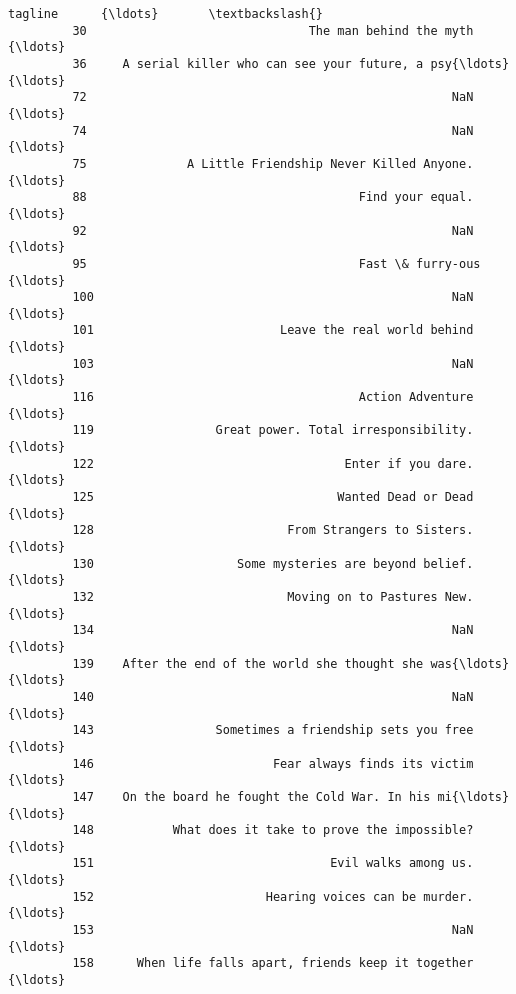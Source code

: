 \documentclass[11pt]{article}
\begin{document}
\begin{Verbatim}[commandchars=\\\{\}]
                                                          tagline      {\ldots}       \textbackslash{}
         30                               The man behind the myth      {\ldots}        
         36     A serial killer who can see your future, a psy{\ldots}      {\ldots}        
         72                                                   NaN      {\ldots}        
         74                                                   NaN      {\ldots}        
         75              A Little Friendship Never Killed Anyone.      {\ldots}        
         88                                      Find your equal.      {\ldots}        
         92                                                   NaN      {\ldots}        
         95                                      Fast \& furry-ous      {\ldots}        
         100                                                  NaN      {\ldots}        
         101                          Leave the real world behind      {\ldots}        
         103                                                  NaN      {\ldots}        
         116                                     Action Adventure      {\ldots}        
         119                 Great power. Total irresponsibility.      {\ldots}        
         122                                   Enter if you dare.      {\ldots}        
         125                                  Wanted Dead or Dead      {\ldots}        
         128                           From Strangers to Sisters.      {\ldots}        
         130                    Some mysteries are beyond belief.      {\ldots}        
         132                           Moving on to Pastures New.      {\ldots}        
         134                                                  NaN      {\ldots}        
         139    After the end of the world she thought she was{\ldots}      {\ldots}        
         140                                                  NaN      {\ldots}        
         143                 Sometimes a friendship sets you free      {\ldots}        
         146                         Fear always finds its victim      {\ldots}        
         147    On the board he fought the Cold War. In his mi{\ldots}      {\ldots}        
         148           What does it take to prove the impossible?      {\ldots}        
         151                                 Evil walks among us.      {\ldots}        
         152                        Hearing voices can be murder.      {\ldots}        
         153                                                  NaN      {\ldots}        
         158      When life falls apart, friends keep it together      {\ldots}        

\end{Verbatim}
\end{document}
